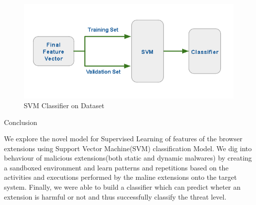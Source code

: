 \documentclass[final]{beamer}
\newlength{\onecolwid}
\begin{document}
\begin{frame}[t]
\begin{columns}[t]
\begin{column}{\onecolwid}
\begin{block}{}
\begin{figure}
\includegraphics[scale=0.98]{ml.png}
\caption{SVM Classifier on Dataset}
\end{figure}
\end{block}

\vspace{-0.7in}
\begin{block}{Conclusion}

We explore the novel model for Supervised Learning of features of the browser extensions using Support Vector Machine(SVM) classification Model. We dig into behaviour of malicious extensions(both static and dynamic malwares) by creating a sandboxed environment and learn patterns and repetitions based on the activities and executions performed by the maline extensions onto the target system. Finally, we were able to build a classifier which can predict wheter an extension is harmful or not and thus successfully classify the threat level.

\end{block}




\end{column}
\end{columns}
\end{frame}
\end{document}
